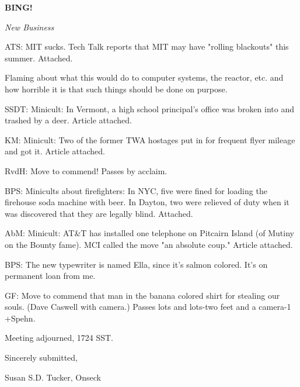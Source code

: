 \documentclass[12pt]{article}
\newcommand{\bing}{{\bf BING!} }
\newcommand{\goto}[1]{\bing \vskip 12pt \centerline{{\em{#1}}}}
\begin{document}
\goto{New Business}

ATS: MIT sucks. Tech Talk reports that MIT may have "rolling blackouts" this summer. Attached.

Flaming about what this would do to computer systems, the reactor, etc. and how horrible it is that such things should be done on purpose.

SSDT: Minicult: In Vermont, a high school principal's office was broken into and trashed by a deer. Article attached.

KM: Minicult: Two of the former TWA hostages put in for frequent flyer mileage and got it. Article attached.

RvdH: Move to commend! Passes by acclaim.

BPS: Minicults about firefighters: In NYC, five were fined for loading the firehouse soda machine with beer. In Dayton, two were relieved of duty when it was discovered that they are legally blind. Attached.

AbM: Minicult: AT&T has installed one telephone on Pitcairn Island (of Mutiny on the Bounty fame). MCI called the move "an absolute coup." Article attached.

BPS: The new typewriter is named Ella, since it's salmon colored. It's on permanent loan from me.

GF: Move to commend that man in the banana colored shirt for stealing our souls. (Dave Caswell with camera.) Passes lots and lots-two feet and a camera-1 +Spehn.

\vspace{12pt}

\noindent
Meeting adjourned, 1724 SST.

\vspace{18pt}

\centerline{Sincerely submitted,}
\centerline{Susan S.D. Tucker, Onseck}
\end{document}
